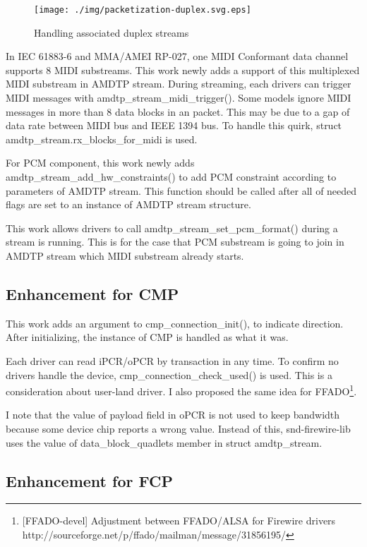 \documentclass[onecolumn]{jarticle}
\begin{document}
\begin{figure}[H]
	\centering
	\texttt{[image: ./img/packetization-duplex.svg.eps]}
	\caption{{Handling associated duplex streams}}
	\label{fig:packetization-duplex}
\end{figure}


In IEC 61883-6\cite{iec61883-6-1, iec61883-6-2} and MMA/AMEI RP-027\cite{amei-rp27}, one MIDI Conformant data channel supports 8 MIDI substreams. This work newly adds a support of this multiplexed MIDI substream in AMDTP stream. During streaming, each drivers can trigger MIDI messages with amdtp\_stream\_midi\_trigger(). Some models ignore MIDI messages in more than 8 data blocks in an packet. This may be due to a gap of data rate between MIDI bus and IEEE 1394 bus. To handle this quirk, struct amdtp\_stream.rx\_blocks\_for\_midi is used.

For PCM component, this work newly adds amdtp\_stream\_add\_hw\_constraints() to add PCM constraint according to parameters of AMDTP stream. This function should be called after all of needed flags are set to an instance of AMDTP stream structure.

This work allows drivers to call amdtp\_stream\_set\_pcm\_format() during a stream is running. This is for the case that PCM substream is going to join in AMDTP stream which MIDI substream already starts.

\subsection{Enhancement for CMP}

This work adds an argument to cmp\_connection\_init(), to indicate direction. After initializing, the instance of CMP is handled as what it was.

Each driver can read iPCR/oPCR by transaction in any time. To confirm no drivers handle the device, cmp\_connection\_check\_used() is used. This is a consideration about user-land driver. I also proposed the same idea for FFADO\footnote{[FFADO-devel] Adjustment between FFADO/ALSA for Firewire drivers  http://sourceforge.net/p/ffado/mailman/message/31856195/}.

I note that the value of payload field in oPCR is not used to keep bandwidth because some device chip reports a wrong value. Instead of this, snd-firewire-lib uses the value of data\_block\_quadlets member in struct amdtp\_stream.

\subsection{Enhancement for FCP}
\end{document}

